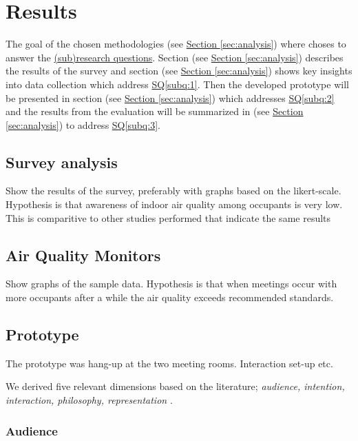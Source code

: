 \section{Results}
\label{sec:results}

The goal of the chosen methodologies (see \hyperref[sec:analysis]{Section \ref*{sec:analysis}}) where choses to answer the \hyperref[rq:1]{(sub)research questions}. Section (see \hyperref[sec:analysis]{Section \ref*{sec:analysis}}) describes the results of the survey and section (see \hyperref[sec:analysis]{Section \ref*{sec:analysis}}) shows key insights into data collection which address \hyperref[subq:1]{SQ\ref*{subq:1}}. Then the developed prototype will be presented in section (see \hyperref[sec:analysis]{Section \ref*{sec:analysis}}) which addresses \hyperref[subq:2]{SQ\ref*{subq:2}} and the results from the evaluation will be summarized in (see \hyperref[sec:analysis]{Section \ref*{sec:analysis}}) to address \hyperref[subq:3]{SQ\ref*{subq:3}}.

\subsection{Survey analysis}
Show the results of the survey, preferably with graphs based on the likert-scale. Hypothesis is that awareness of indoor air quality among occupants is very low. This is comparitive to other studies performed that indicate the same results 

\subsection{Air Quality Monitors}

Show graphs of the sample data. Hypothesis is that when meetings occur with more occupants after a while the air quality exceeds recommended standards.

\subsection{Prototype}

The prototype was hang-up at the two meeting rooms. Interaction set-up etc.

We derived five relevant dimensions based on the literature; \textit{audience, intention, interaction, philosophy, representation} \cite{sauve_physecology_2022, hornecker_design_2023}.

\subsubsection{Audience}

